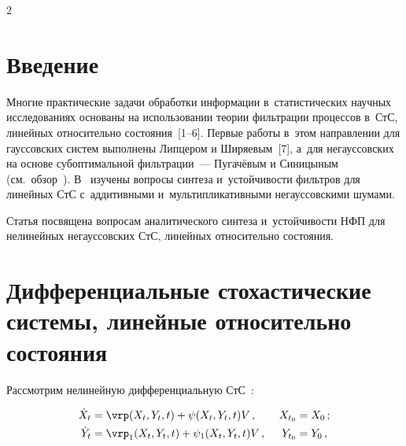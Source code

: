 \begin{multicols}{2}



\label{st\stat}







\section{Введение}



\vspace*{-4pt}



Многие практические задачи обработки информации в~статистических научных исследованиях основаны на использовании теории фильтрации процессов в~СтС, линейных относительно состояния~[1--6]. Первые работы в~этом направлении для гауссовских систем выполнены Липцером и Ширяевым~[7], а~для негауссовских на основе субоптимальной фильтрации~--- Пугачёвым и Синицыным (см.\ обзор~\cite{1-sin}). В~\cite{2-sin, 3-sin} изучены вопросы синтеза и~устойчивости фильтров для линейных СтС с~аддитивными и~мультипликативными негауссовскими шумами.

Статья посвящена вопросам аналитического синтеза и~устойчивости НФП для нелинейных негауссовских СтС, линейных относительно состояния.



\vspace*{-14pt}



\section{Дифференциальные стохастические системы, линейные относительно состояния}



\vspace*{-4pt}



Рассмотрим нелинейную дифференциальную СтС~\cite{1-sin}:



\noindent

    \begin{alignat}{2}

    \dot X_t &=\vrp (X_t, Y_t, t) + \psi (X_t, Y_t, t) V\,, &\ X_{t_0} &= X_0\,;\label{e1-sin}\\

   \dot Y_t &=\vrp_1 (X_t, Y_t, t) + \psi_1 (X_t, Y_t, t) V\,, &\ Y_{t_0}& = Y_0\,,\label{e2-sin}


\end{alignat}
\end{multicols}
